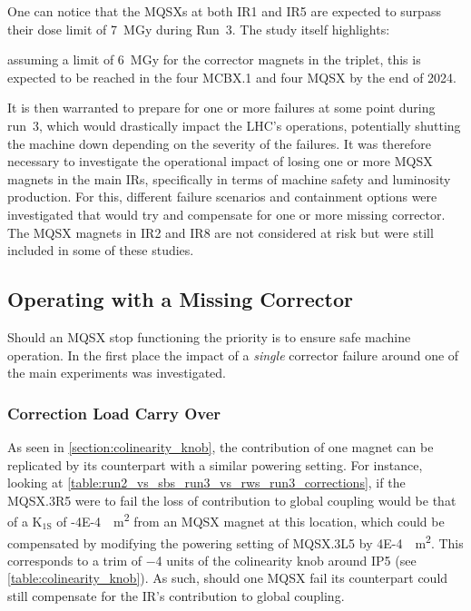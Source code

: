 One can notice that the MQSXs at both IR\num{1} and IR\num{5} are expected to surpass their dose limit of \qty{7}{\mega\gray} during Run~\num{3}.
The study itself highlights:

\begin{quoteblock}
    [\dots] assuming a limit of \qty{6}{\mega\gray} for the corrector magnets in the triplet, this is expected to be reached in the four MCBX.1 and four MQSX by the end of 2024.
\end{quoteblock}

It is then warranted to prepare for one or more failures at some point during \Gls{run}~\num{3}, which would drastically impact the LHC's operations, potentially shutting the machine down depending on the severity of the failures.
It was therefore necessary to investigate the operational impact of losing one or more MQSX magnets in the main IRs, specifically in terms of machine safety and luminosity production.
For this, different failure scenarios and containment options were investigated that would try and compensate for one or more missing corrector.
The MQSX magnets in IR\num{2} and IR\num{8} are not considered at risk but were still included in some of these studies.

\subsection{Operating with a Missing Corrector}

Should an MQSX stop functioning the priority is to ensure safe machine operation.
In the first place the impact of a \textit{single} corrector failure around one of the main experiments was investigated.

\subsubsection*{Correction Load Carry Over}

As seen in \cref{section:colinearity_knob}, the contribution of one magnet can be replicated by its counterpart with a similar powering setting.
For instance, looking at \cref{table:run2_vs_sbs_run3_vs_rws_run3_corrections}, if the MQSX.\num{3}R\num{5} were to fail the loss of contribution to global coupling would be that of a \(\mathrm{K_{1S}}\) of \qty{-4E-4}{\per\square\meter} from an MQSX magnet at this location, which could be compensated by modifying the powering setting of MQSX.\num{3}L\num{5} by \qty{4E-4}{\per\square\meter}.
This corresponds to a trim of \num{-4} units of the colinearity knob around IP\num{5} (see \cref{table:colinearity_knob}).
As such, should one MQSX fail its counterpart could still compensate for the \acrshort{IR}'s contribution to global coupling.

